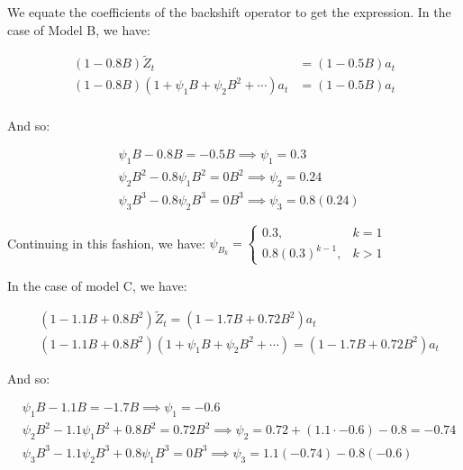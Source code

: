 \documentclass[12pt, letterpaper]{article}
\theoremstyle{definition}
\numberwithin{equation}{section}
\newcommand{\+}[1]{+_{\scalebox{.375}{#1}}}
\newcommand{\1}{\mathbbm{1}}
\begin{document}
We equate the coefficients of the backshift operator to get the expression. In the case of Model B, we have:

\vspace{-0.5cm}
\begin{align*}
	(1-0.8B)\tilde{Z}_t&=(1-0.5B)a_t\\
	(1-0.8B)\left(1+\psi_1B+\psi_2B^2+\cdots\right)a_t&=(1-0.5B)a_t\\
\end{align*}
\vspace{-1.0cm}

And so:

\vspace{-0.5cm}
\begin{align*}
	&\psi_1B-0.8B=-0.5B \implies \psi_1=0.3\\
	&\psi_2B^2-0.8\psi_1B^2=0B^2 \implies \psi_2=0.24\\
	&\psi_3B^3-0.8\psi_2B^3=0B^3 \implies \psi_3=0.8(0.24)
\end{align*}

Continuing in this fashion, we have: $\psi_{B_k}=\begin{cases}
	0.3, &\text{$k=1$}\\
	0.8(0.3)^{k-1}, &\text{$k>1$}
\end{cases}$
\vspace{\baselineskip}
\vspace{\baselineskip}
\vspace{\baselineskip}


In the case of model C, we have:

\vspace{-0.5cm}
\begin{align*}
	&(1-1.1B+0.8B^2)\tilde{Z}_t=(1-1.7B+0.72B^2)a_t\\
	&(1-1.1B+0.8B^2)\left(1+\psi_1B+\psi_2B^2+\cdots\right)=(1-1.7B+0.72B^2)a_t
\end{align*}
\vspace{-0.5cm}

And so:

\vspace{-0.5cm}
\begin{align*}
	&\psi_1B-1.1B=-1.7B \implies \psi_1=-0.6\\
	&\psi_2B^2-1.1\psi_1B^2+0.8B^2=0.72B^2 \implies \psi_2=0.72+(1.1 \cdot -0.6)-0.8=-0.74\\
	&\psi_3B^3-1.1\psi_2B^3+0.8\psi_1B^3=0B^3 \implies \psi_3=1.1(-0.74)-0.8(-0.6)
\end{align*}
\vspace{-0.5cm}
\end{document}
